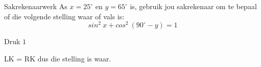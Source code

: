 \begin{wex}
{Sakrekenaarwerk}
{As $x=25^{\circ}$ en $y=65^{\circ}$ is, gebruik jou sakrekenaar om te bepaal of die volgende stelling waar of vals is:
\begin{equation*}
sin^{2}~x + cos^{2}~(90^{\circ}-y) = 1
\end{equation*}
}
{
Druk \fbox{(}   \fbox{)}  \fbox{\LARGE +} \fbox{(}  \fbox{(}  \fbox{\LARGE -}  \fbox{)} \fbox{)}   \fbox{\LARGE =} $1$


LK = RK dus die stelling is waar.



}
\end{wex}

